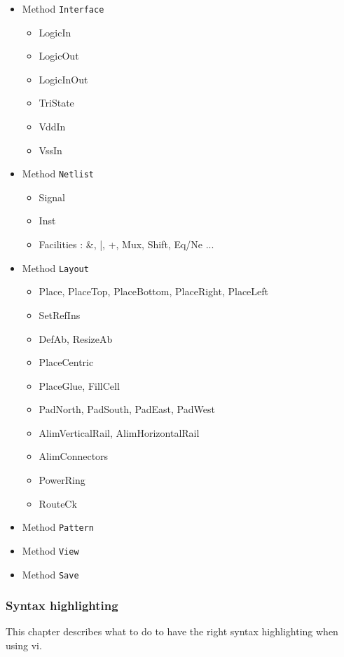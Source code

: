 \begin{itemize}
\item Method \verb-Interface-
    \begin{itemize}
        \item LogicIn
        \item LogicOut
        \item LogicInOut
        \item TriState
        \item VddIn
        \item VssIn
    \end{itemize}
\item Method \verb-Netlist-
    \begin{itemize}
        \item Signal
        \item Inst
        \item Facilities : \&, |, +, Mux, Shift, Eq/Ne ...
    \end{itemize}
\item Method \verb-Layout-
    \begin{itemize}
        \item Place, PlaceTop, PlaceBottom, PlaceRight, PlaceLeft
        \item SetRefIns
        \item DefAb, ResizeAb
        \item PlaceCentric
        \item PlaceGlue, FillCell
        \item PadNorth, PadSouth, PadEast, PadWest
        \item AlimVerticalRail, AlimHorizontalRail
        \item AlimConnectors
        \item PowerRing
        \item RouteCk
    \end{itemize}
    \item Method \verb-Pattern-
    \item Method \verb-View-
    \item Method \verb-Save-
\end{itemize}

\subsubsection{Syntax highlighting}

This chapter describes what to do to have the right syntax highlighting when using vi.

